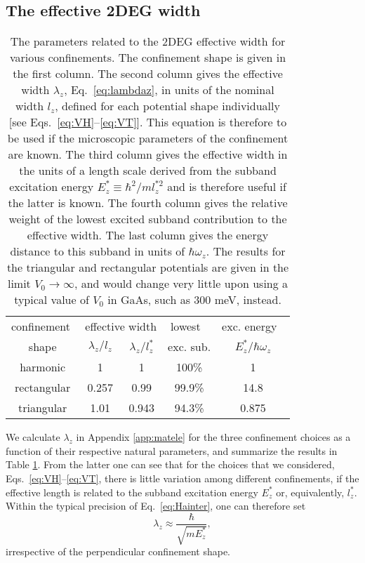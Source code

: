 \documentclass[aps,floatfix,twocolumn,showpacs,10pt,nofootinbib]{revtex4-1}
\newcommand{\be}{\begin{equation}}
\newcommand{\ee}{\end{equation}}
\begin{document}
\subsection{The effective 2DEG width}

\begin{table}
\begin{tabular}{ccccc}
\hline \hline
confinement\,\, & \multicolumn{2}{c}{effective width}  & lowest \,\,& exc. energy \,\,\\
shape& $\lambda_z/l_z$ & $\lambda_z/l_z^*$ & exc. sub.& $E_z^* / \hbar \omega_z$ \\
\hline
harmonic & 1  & 1 & 100\% & 1\\
rectangular & 0.257  & 0.99 & 99.9\% & 14.8\\
triangular & 1.01 & 0.943  & 94.3\% & 0.875\\
\hline \hline
\end{tabular}
\caption{\label{tab:lambdaz}
The parameters related to the 2DEG effective width for various confinements. The confinement shape is given in the first column. The second column gives the effective width $\lambda_z$, Eq.~\eqref{eq:lambdaz}, in units of the nominal width $l_z$, defined for each potential shape individually [see Eqs.~\eqref{eq:VH}--\eqref{eq:VT}]. This equation is therefore to be used if the microscopic parameters of the confinement are known. The third column gives the effective width in the units of a length scale derived from the subband excitation energy $E_z^* \equiv \hbar^2/ml_z^{*2}$ and is therefore useful if the latter is known. The fourth column gives the relative weight of the lowest excited subband contribution to the effective width. The last column gives the energy distance to this subband in units of $\hbar \omega_z$.  The results for the triangular and rectangular potentials are given in  the limit $V_0 \to \infty$, and would change  very little upon using a typical value of $V_0$ in GaAs, such as 300 meV, instead.}
\end{table}

We calculate $\lambda_z$ in Appendix \ref{app:matele} for the three confinement choices as a function of their respective natural parameters, and summarize the results in Table \ref{tab:lambdaz}. From the latter one can see that for the choices that we considered, Eqs.~\eqref{eq:VH}--\eqref{eq:VT}, there is little variation among different confinements, if the effective length is related to the subband excitation energy $E_z^*$ or, equivalently, $l_z^*$. Within the typical precision of Eq.~\eqref{eq:Hainter}, one can therefore set
\be
\lambda_z \approx \frac{\hbar}{\sqrt{m E_z^*}},
\label{eq:lambdazapprox}
\ee
irrespective of the perpendicular confinement shape.
\end{document}
